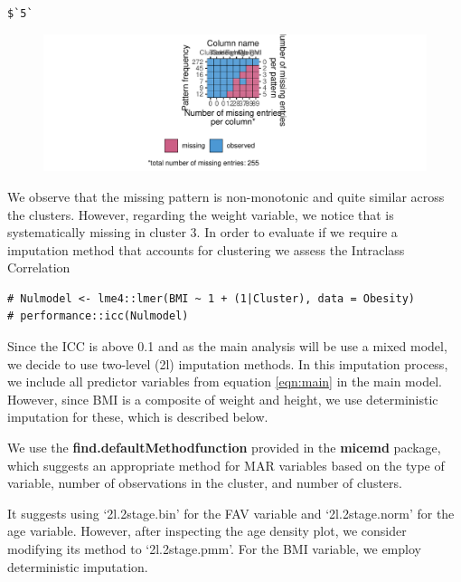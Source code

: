 \documentclass[
  article]{jss}
\begin{document}
\begin{verbatim}

$`5`
\end{verbatim}

\begin{figure}[h]

{\centering \includegraphics{manuscript_files/figure-pdf/unnamed-chunk-49-5.pdf}

}

\end{figure}

We observe that the missing pattern is non-monotonic and quite similar
across the clusters. However, regarding the weight variable, we notice
that is systematically missing in cluster 3. In order to evaluate if we
require a imputation method that accounts for clustering we assess the
Intraclass Correlation

\begin{verbatim}
# Nulmodel <- lme4::lmer(BMI ~ 1 + (1|Cluster), data = Obesity)
# performance::icc(Nulmodel)
\end{verbatim}

Since the ICC is above 0.1 and as the main analysis will be use a mixed
model, we decide to use two-level (2l) imputation methods. In this
imputation process, we include all predictor variables from equation
\ref{eqn:main} in the main model. However, since BMI is a composite of
weight and height, we use deterministic imputation for these, which is
described below.

We use the \textbf{find.defaultMethodfunction} provided in the
\textbf{micemd} package, which suggests an appropriate method for MAR
variables based on the type of variable, number of observations in the
cluster, and number of clusters.

It suggests using `2l.2stage.bin' for the FAV variable and
`2l.2stage.norm' for the age variable. However, after inspecting the age
density plot, we consider modifying its method to `2l.2stage.pmm'. For
the BMI variable, we employ deterministic imputation.
\end{document}
